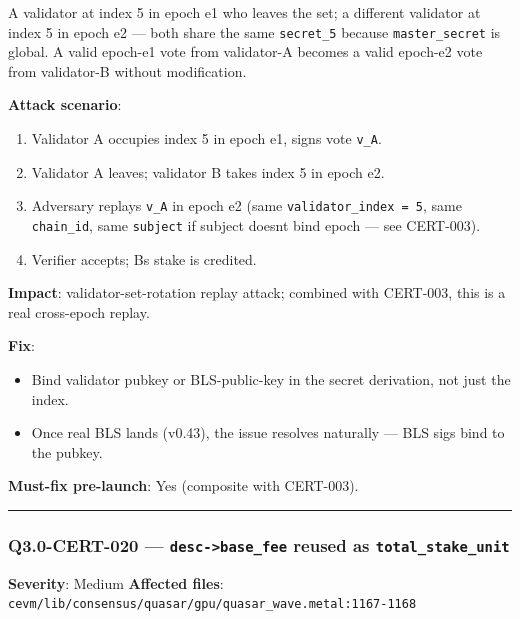 \documentclass[
]{article}
\providecommand{\tightlist}{%
  \setlength{\itemsep}{0pt}\setlength{\parskip}{0pt}}
\begin{document}
A validator at index 5 in epoch e1 who leaves the set; a different
validator at index 5 in epoch e2 --- both share the same
\texttt{secret\_5} because \texttt{master\_secret} is global. A valid
epoch-e1 vote from validator-A becomes a valid epoch-e2 vote from
validator-B without modification.

\textbf{Attack scenario}:

\begin{enumerate}
\def\labelenumi{\arabic{enumi}.}
\tightlist
\item
  Validator A occupies index 5 in epoch e1, signs vote \texttt{v\_A}.
\item
  Validator A leaves; validator B takes index 5 in epoch e2.
\item
  Adversary replays \texttt{v\_A} in epoch e2 (same
  \texttt{validator\_index\ =\ 5}, same \texttt{chain\_id}, same
  \texttt{subject} if subject doesn\textquotesingle t bind epoch --- see
  CERT-003).
\item
  Verifier accepts; B\textquotesingle s stake is credited.
\end{enumerate}

\textbf{Impact}: validator-set-rotation replay attack; combined with
CERT-003, this is a real cross-epoch replay.

\textbf{Fix}:

\begin{itemize}
\tightlist
\item
  Bind validator pubkey or BLS-public-key in the secret derivation, not
  just the index.
\item
  Once real BLS lands (v0.43), the issue resolves naturally --- BLS sigs
  bind to the pubkey.
\end{itemize}

\textbf{Must-fix pre-launch}: Yes (composite with CERT-003).

\begin{center}\rule{0.5\linewidth}{0.5pt}\end{center}

\subsubsection{\texorpdfstring{Q3.0-CERT-020 ---
\texttt{desc-\textgreater{}base\_fee} reused as
\texttt{total\_stake\_unit}}{Q3.0-CERT-020 --- desc-\textgreater base\_fee reused as total\_stake\_unit}}\label{q30-cert-020--desc-base_fee-reused-as-total_stake_unit}

\textbf{Severity}: Medium \textbf{Affected files}:
\texttt{cevm/lib/consensus/quasar/gpu/quasar\_wave.metal:1167-1168}
\end{document}
